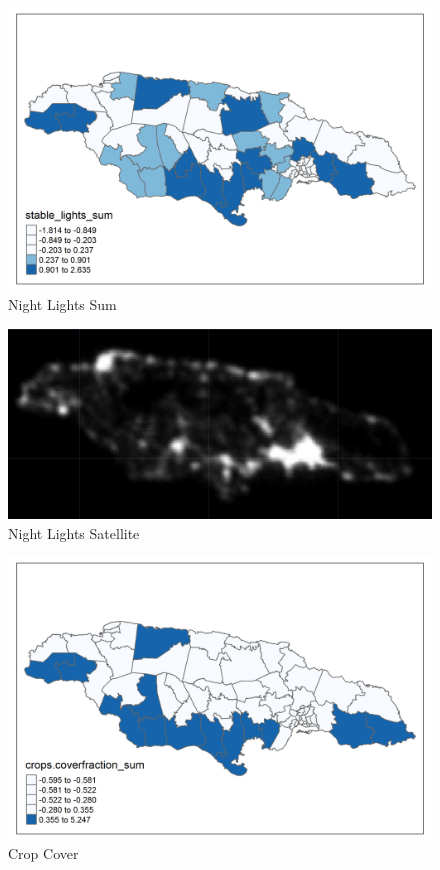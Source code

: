 \documentclass[
  12pt,
]{book}
\begin{document}
\begin{figure}
\centering
\includegraphics{Recursos/01_Session1/06_stable_lights_sum.png}
\caption{Night Lights Sum}
\end{figure}

\begin{figure}
\centering
\includegraphics{Recursos/01_Session1/07_Luces_nocturnas.PNG}
\caption{Night Lights Satellite}
\end{figure}

\begin{figure}
\centering
\includegraphics{Recursos/01_Session1/08_crops.coverfraction_sum.png}
\caption{Crop Cover}
\end{figure}
\end{document}
